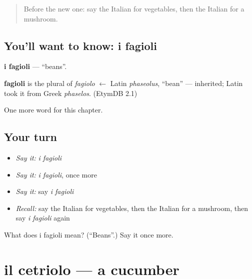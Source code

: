 \label{lesson:IT-C106-fagioli}



\begin{quote}
Before the new one: say the Italian for vegetables, then the Italian for a mushroom.
\end{quote}

\subsection*{You'll want to know: i fagioli}
\textbf{i fagioli} — \textquotedblleft{}beans\textquotedblright{}.

\begin{cousinweb}
\textbf{fagioli} is the plural of \emph{fagiolo} $\leftarrow$ Latin \emph{phaseolus}, \textquotedblleft{}bean\textquotedblright{} — inherited; Latin took it from Greek \emph{phaselos}. (EtymDB 2.1)
\end{cousinweb}

\begin{grammarlens}[title={What you've built}]
One more word for this chapter.
\end{grammarlens}

\subsection*{Your turn}
\begin{itemize}
\raggedright
  \item \emph{Say it:} \emph{i fagioli}
  \item \emph{Say it:} \emph{i fagioli}, once more
  \item \emph{Say it:} say \emph{i fagioli}
  \item \emph{Recall:} say the Italian for vegetables, then the Italian for a mushroom, then say \emph{i fagioli} again
\end{itemize}

\begin{tcolorbox}[breakable,colback=teal!4,colframe=teal!35!black,title={Before you move on}]
What does i fagioli mean? (\textquotedblleft{}Beans\textquotedblright{}.) Say it once more.
\end{tcolorbox}
\section[il cetriolo]{il cetriolo — a cucumber}

\label{lesson:IT-C106-cetriolo}



